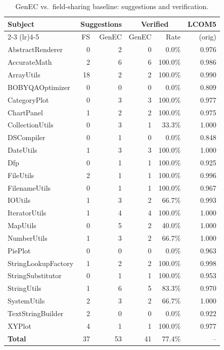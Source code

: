 \begin{table}[t]
\centering
\caption{GenEC vs.\ field-sharing baseline: suggestions and verification.}
\label{tab:rq1}
\begin{tabular}{lrrrrr}
\toprule
Subject & \multicolumn{2}{c}{Suggestions} & \multicolumn{2}{c}{Verified} & LCOM5 \\
\cmidrule(lr){2-3} \cmidrule(lr){4-5}
 & FS & GenEC & GenEC & Rate & (orig) \\
\midrule
AbstractRenderer & 0 & 2 & 0 & 0.0\% & 0.976 \\
AccurateMath & 2 & 6 & 6 & 100.0\% & 0.986 \\
ArrayUtils & 18 & 2 & 2 & 100.0\% & 0.990 \\
BOBYQAOptimizer & 0 & 0 & 0 & 0.0\% & 0.809 \\
CategoryPlot & 0 & 3 & 3 & 100.0\% & 0.977 \\
ChartPanel & 1 & 2 & 2 & 100.0\% & 0.975 \\
CollectionUtils & 0 & 3 & 1 & 33.3\% & 1.000 \\
DSCompiler & 0 & 1 & 0 & 0.0\% & 0.848 \\
DateUtils & 1 & 3 & 3 & 100.0\% & 1.000 \\
Dfp & 0 & 1 & 1 & 100.0\% & 0.925 \\
FileUtils & 2 & 1 & 1 & 100.0\% & 0.996 \\
FilenameUtils & 0 & 1 & 1 & 100.0\% & 0.967 \\
IOUtils & 1 & 3 & 2 & 66.7\% & 0.993 \\
IteratorUtils & 1 & 4 & 4 & 100.0\% & 1.000 \\
MapUtils & 0 & 5 & 2 & 40.0\% & 1.000 \\
NumberUtils & 1 & 3 & 2 & 66.7\% & 1.000 \\
PiePlot & 0 & 0 & 0 & 0.0\% & 0.963 \\
StringLookupFactory & 1 & 2 & 2 & 100.0\% & 0.998 \\
StringSubstitutor & 0 & 1 & 1 & 100.0\% & 0.953 \\
StringUtils & 1 & 6 & 5 & 83.3\% & 0.970 \\
SystemUtils & 2 & 3 & 2 & 66.7\% & 1.000 \\
TextStringBuilder & 2 & 0 & 0 & 0.0\% & 0.922 \\
XYPlot & 4 & 1 & 1 & 100.0\% & 0.977 \\
\midrule
\textbf{Total} & 37 & 53 & 41 & 77.4\% & -- \\
\bottomrule
\end{tabular}
\end{table}
